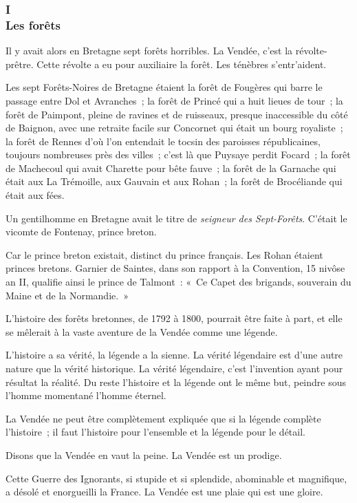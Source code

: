 \documentclass[french,twoside]{book} %
\begin{document}
\subsubsection[{I. Les forêts}]{I \\
Les forêts}
\label{p3l1c1}
\noindent Il y avait alors en Bretagne sept forêts horribles. La Vendée, c’est la révolte-prêtre. Cette révolte a eu pour auxiliaire la forêt. Les ténèbres s’entr’aident.\par
Les sept Forêts-Noires de Bretagne étaient la forêt de Fougères qui barre le passage entre Dol et Avranches ; la forêt de Princé qui a huit lieues de tour ; la forêt de Paimpont, pleine de ravines et de ruisseaux, presque inaccessible du côté de Baignon, avec une retraite facile sur Concornet qui était un bourg royaliste ; la forêt de Rennes d’où l’on entendait le tocsin des paroisses républicaines, toujours nombreuses près des villes ; c’est là que Puysaye perdit Focard ; la forêt de Machecoul qui avait Charette pour bête fauve ; la forêt de la Garnache qui était aux La Trémoille, aux Gauvain et aux Rohan ; la forêt de Brocéliande qui était aux fées.\par
 Un gentilhomme en Bretagne avait le titre de \emph{seigneur des Sept-Forêts}. C’était le vicomte de Fontenay, prince breton.\par
Car le prince breton existait, distinct du prince français. Les Rohan étaient princes bretons. Garnier de Saintes, dans son rapport à la Convention, 15 nivôse an II, qualifie ainsi le prince de Talmont : « Ce Capet des brigands, souverain du Maine et de la Normandie. »\par
L’histoire des forêts bretonnes, de 1792 à 1800, pourrait être faite à part, et elle se mêlerait à la vaste aventure de la Vendée comme une légende.\par
L’histoire a sa vérité, la légende a la sienne. La vérité légendaire est d’une autre nature que la vérité historique. La vérité légendaire, c’est l’invention ayant pour résultat la réalité. Du reste l’histoire et la légende ont le même but, peindre sous l’homme momentané l’homme éternel.\par
La Vendée ne peut être complètement expliquée que si la légende complète l’histoire ; il faut l’histoire pour l’ensemble et la légende pour le détail.\par
Disons que la Vendée en vaut la peine. La Vendée est un prodige.\par
Cette Guerre des Ignorants, si stupide et si splendide, abominable et magnifique, a désolé et enorgueilli la France. La Vendée est une plaie qui est une gloire.\par
\end{document}
